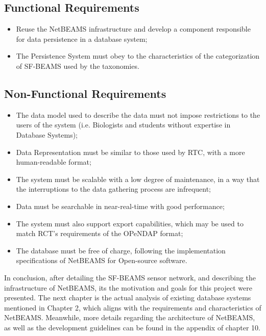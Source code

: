 \subsection{Functional Requirements}

\begin{itemize}
  \item Reuse the NetBEAMS infrastructure and develop a component responsible
  for data persistence in a database system;
  \item The Persistence System must obey to the characteristics of the
  categorization of SF-BEAMS used by the taxonomies.
\end{itemize}

\subsection{Non-Functional Requirements}

\begin{itemize}
  \item The data model used to describe the data must not impose restrictions
  to the users of the system (i.e. Biologists and students without expertise in
  Database Systems);
  \item Data Representation must be similar to those used by RTC, with a
  more human-readable format;
  \item The system must be scalable with a low degree of maintenance, in a
  way that the interruptions to the data gathering process are infrequent;
  \item Data must be searchable in near-real-time with good performance;
  \item The system must also support export capabilities, which may
  be used to match RCT's requirements of the OPeNDAP format;
  \item The database must be free of charge, following the
  implementation specifications of NetBEAMS for Open-source software.
\end{itemize}

In conclusion, after detailing the SF-BEAMS sensor network, and describing the 
infrastructure of NetBEAMS, its the motivation and goals for this project were 
presented. The next chapter is the actual analysis of existing database systems 
mentioned in Chapter 2, which aligns with the requirements and characteristics of 
NetBEAMS. Meanwhile, more details regarding the architecture of NetBEAMS, as well as
the development guidelines can be found in the appendix of chapter 10.
